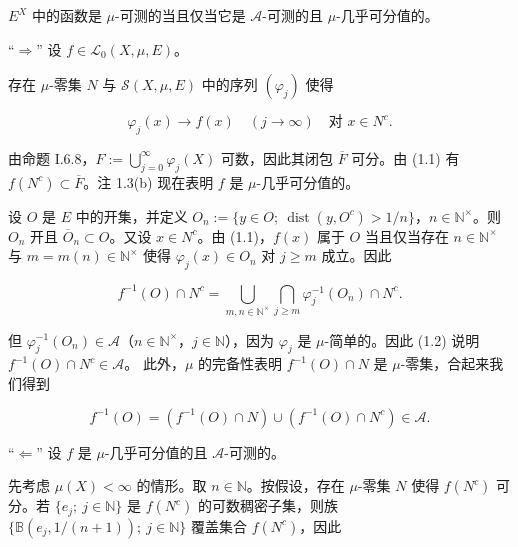 \begin{theorem}

$ E^X $ 中的函数是 $ \mu $-可测的当且仅当它是 $ \mathcal{A} $-可测的且 $ \mu $-几乎可分值的。

\proofhead
“$ \Rightarrow $” 设 $ f \in \mathcal{L}_0(X,\mu,E) $。

\begin{subitems}
\item

存在 $ \mu $-零集 $ N $ 与 $ \mathcal{S}(X,\mu,E) $ 中的序列 $ (\varphi_j) $ 使得

\begin{equation}
\varphi_j(x) \to f(x) \quad (j \to \infty) \quad \text{对 } x \in N^c .\tag{1.1}
\end{equation}

由命题 I.6.8，$ F := \bigcup_{j=0}^{\infty} \varphi_j(X) $ 可数，因此其闭包 $ \overline{F} $ 可分。由 (1.1) 有 $ f(N^c) \subset \overline{F} $。注 1.3(b) 现在表明 $ f $ 是 $ \mu $-几乎可分值的。

\item

设 $ O $ 是 $ E $ 中的开集，并定义 $ O_n := \{ y \in O ;\ \operatorname{dist}(y,O^c) > 1/n \} $，$ n \in \mathbb{N}^\times $。则 $ O_n $ 开且 $ \overline{O}_n \subset O $。又设 $ x \in N^c $。由 (1.1)，$ f(x) $ 属于 $ O $ 当且仅当存在 $ n \in \mathbb{N}^\times $ 与 $ m = m(n) \in \mathbb{N}^\times $ 使得 $ \varphi_j(x) \in O_n $ 对 $ j \ge m $ 成立。因此

\begin{equation}
f^{-1}(O) \cap N^c = \bigcup_{m,n \in \mathbb{N}^\times} \bigcap_{j \ge m} \varphi_j^{-1}(O_n) \cap N^c .\tag{1.2}
\end{equation}

但 $ \varphi_j^{-1}(O_n) \in \mathcal{A} $（$ n \in \mathbb{N}^\times $，$ j \in \mathbb{N} $），因为 $ \varphi_j $ 是 $ \mu $-简单的。因此 (1.2) 说明 $ f^{-1}(O) \cap N^c \in \mathcal{A} $。
此外，$ \mu $ 的完备性表明 $ f^{-1}(O) \cap N $ 是 $ \mu $-零集，合起来我们得到

\[
f^{-1}(O) = (f^{-1}(O) \cap N) \cup (f^{-1}(O) \cap N^c) \in \mathcal{A} .
\]

“$ \Leftarrow $” 设 $ f $ 是 $ \mu $-几乎可分值的且 $ \mathcal{A} $-可测的。

\item

先考虑 $ \mu(X) < \infty $ 的情形。取 $ n \in \mathbb{N} $。按假设，存在 $ \mu $-零集 $ N $ 使得 $ f(N^c) $ 可分。若 $ \{ e_j ;\ j \in \mathbb{N} \} $ 是 $ f(N^c) $ 的可数稠密子集，则族 $ \{ \mathbb{B}(e_j,1/(n+1)) ;\ j \in \mathbb{N} \} $ 覆盖集合 $ f(N^c) $，因此


\end{subitems}
\end{theorem}
